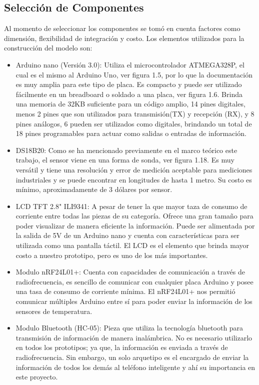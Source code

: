 \subsection{Selección de Componentes}
\par 
Al momento de seleccionar los componentes se tomó en cuenta factores como dimensión, flexibilidad de integración y costo. Los elementos utilizados para la construcción del modelo son:

\begin{itemize}
	\item Arduino nano (Versión 3.0): Utiliza el microcontrolador ATMEGA328P, el cual es el mismo al Arduino Uno, ver figura 1.5, por lo que la documentación es muy amplia para este tipo de placa. Es compacto y puede ser utilizado fácilmente en un breadboard o soldado a una placa, ver figura 1.6. Brinda una memoria de 32KB suficiente para un código amplio, 14 pines digitales, menos 2 pines que son utilizados para transmisión(TX) y recepción (RX), y 8 pines análogos, 6 pueden ser utilizados como digitales, brindando un total de 18 pines programables para actuar como salidas o entradas de información.
	
	\item DS18B20: Como se ha mencionado previamente en el marco teórico este trabajo, el sensor viene en una forma de sonda, ver figura 1.18. Es muy versátil y tiene una resolución y error de medición aceptable para mediciones industriales y se puede encontrar en longitudes de hasta 1 metro. Su costo es mínimo, aproximadamente de 3 dólares por sensor. 
	
	\item LCD TFT 2.8" ILI9341: A pesar de tener la que mayor taza de consumo de corriente entre todas las piezas de su categoría. Ofrece una gran tamaño para poder visualizar de manera eficiente la información. Puede ser alimentada por la salida de 5V de un Arduino nano y cuenta con características para ser utilizada como una pantalla táctil. El LCD es el elemento que brinda mayor costo a nuestro prototipo, pero es uno de los más importantes.
	
	\item Modulo nRF24L01+: Cuenta con capacidades de comunicación a través de radiofrecuencia, es sencillo de comunicar con cualquier placa Arduino y posee una tasa de consumo de corriente mínima. El nRF24L01+ nos permitió comunicar múltiples Arduino entre sí para poder enviar la información de los sensores de temperatura.
	
	\item Modulo Bluetooth (HC-05): Pieza que utiliza la tecnología bluetooth para transmisión de información de manera inalámbrica. No es necesario utilizarlo en todos los prototipos; ya que, la información es enviada a través de radiofrecuencia. Sin embargo, un solo arquetipo es el encargado de enviar la información de todos los demás al teléfono inteligente y ahí su importancia en este proyecto. 
	
\end{itemize}

